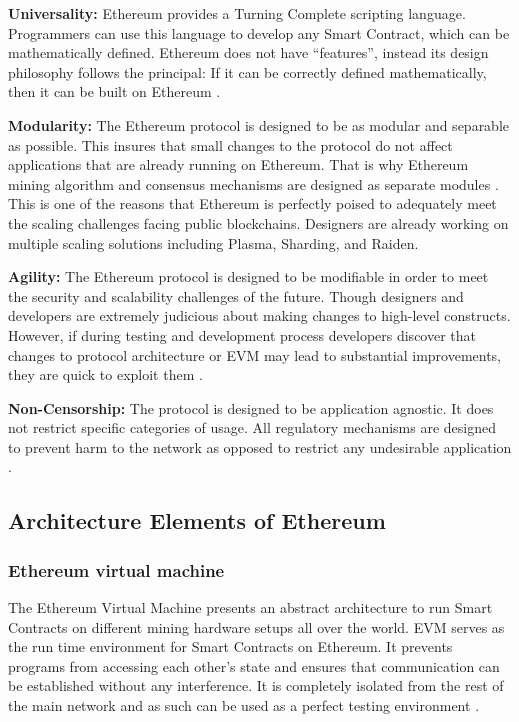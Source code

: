 \textbf{Universality:} Ethereum provides a Turning Complete scripting language.  Programmers can use this language to develop any Smart Contract, which can be mathematically defined.  Ethereum does not have “features”, instead its design philosophy follows the principal: If it can be correctly defined mathematically, then it can be built on Ethereum \cite{eth:001}. 

\textbf{Modularity:} The Ethereum protocol is designed to be as modular and separable as possible. This insures that small changes to the protocol do not affect applications that are already running on Ethereum. That is why Ethereum mining algorithm and consensus mechanisms are designed as separate modules \cite{eth:001}. This is one of the reasons that Ethereum is perfectly poised to adequately meet the scaling challenges facing public blockchains. Designers are already working on multiple scaling solutions including Plasma, Sharding, and Raiden.

\textbf{Agility:} The Ethereum protocol is designed to be modifiable in order to meet the security and scalability challenges of the future. Though designers and developers are extremely judicious about making changes to high-level constructs. However, if during testing and development process developers discover that changes to protocol architecture or EVM may lead to substantial improvements, they are quick to exploit them \cite{eth:001}. 

\textbf{Non-Censorship:} The protocol is designed to be application agnostic. It does not restrict specific categories of usage. All regulatory mechanisms are designed to prevent harm to the network as opposed to restrict any undesirable application \cite{eth:001}.
\vspace{0.5cm}  
\subsection*{Architecture Elements of Ethereum}
\subsubsection{Ethereum virtual machine}
The Ethereum Virtual Machine presents an abstract architecture to run Smart Contracts on different mining hardware setups all over the world. EVM serves as the run time environment for Smart Contracts on Ethereum. It prevents programs from accessing each other’s state and ensures that communication can be established without any interference. It is completely isolated from the rest of the main network and as such can be used as a perfect testing environment \cite{misc:023}.
\vspace{0.5cm}  
